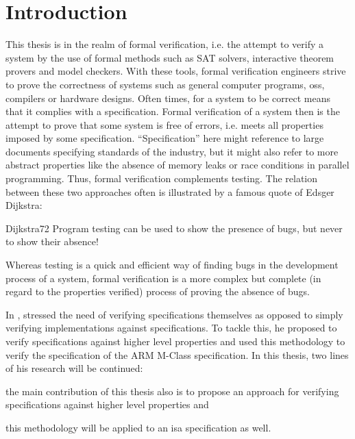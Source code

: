 
\section{Introduction}
\label{sec:introduction}

This thesis is in the realm of formal verification, i.e. the attempt to verify a system by the use of formal methods such as SAT solvers, interactive theorem provers and model checkers.
With these tools, formal verification engineers strive to prove the correctness of systems such as general computer programs, \glspl{os}, compilers or hardware designs.
Often times, for a system to be correct means that it complies with a specification.
Formal verification of a system then is the attempt to prove that some system is free of errors, i.e. meets all properties imposed by some specification.
\enquote{Specification} here might reference to large documents specifying standards of the industry, but it might also refer to more abstract properties like the absence of memory leaks or race conditions in parallel programming.
Thus, formal verification complements testing.
The relation between these two approaches often is illustrated by a famous quote of Edsger Dijkstra:
\begin{displaycquote}[p.6]{Dijkstra72}
    Program testing can be used to show the presence of bugs, but never to show their absence!
\end{displaycquote}

Whereas testing is a quick and efficient way of finding bugs in the development process of a system, formal verification is a more complex but complete (in regard to the properties verified) process of proving the absence of bugs.

In  \cite{Reid17}, \citeauthor{Reid17} stressed the need of verifying specifications themselves as opposed to simply verifying implementations against specifications.
To tackle this, he proposed to verify specifications against higher level properties and used this methodology to verify the specification of the ARM M-Class specification.
In this thesis, two lines of his research will be continued: \begin{enumerate*}[label=\alph*)]
    \item the main contribution of this thesis also is to propose an approach for verifying specifications against higher level properties and
    \item this methodology will be applied to an \gls{isa} specification as well.
\end{enumerate*}

